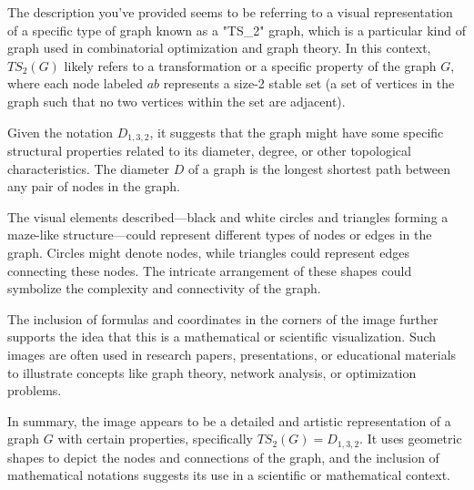The description you've provided seems to be referring to a visual representation of a specific type of graph known as a "TS_2" graph, which is a particular kind of graph used in combinatorial optimization and graph theory. In this context, \(TS_2(G)\) likely refers to a transformation or a specific property of the graph \(G\), where each node labeled \(ab\) represents a size-2 stable set (a set of vertices in the graph such that no two vertices within the set are adjacent).

Given the notation \(D_{1,3,2}\), it suggests that the graph might have some specific structural properties related to its diameter, degree, or other topological characteristics. The diameter \(D\) of a graph is the longest shortest path between any pair of nodes in the graph.

The visual elements described—black and white circles and triangles forming a maze-like structure—could represent different types of nodes or edges in the graph. Circles might denote nodes, while triangles could represent edges connecting these nodes. The intricate arrangement of these shapes could symbolize the complexity and connectivity of the graph.

The inclusion of formulas and coordinates in the corners of the image further supports the idea that this is a mathematical or scientific visualization. Such images are often used in research papers, presentations, or educational materials to illustrate concepts like graph theory, network analysis, or optimization problems.

In summary, the image appears to be a detailed and artistic representation of a graph \(G\) with certain properties, specifically \(TS_2(G) = D_{1,3,2}\). It uses geometric shapes to depict the nodes and connections of the graph, and the inclusion of mathematical notations suggests its use in a scientific or mathematical context.